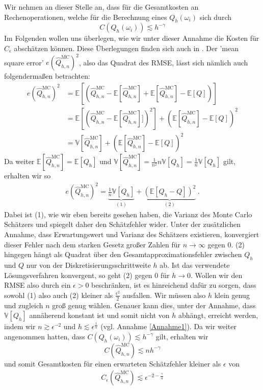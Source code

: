 Wir nehmen an dieser Stelle an, dass für die Gesamtkosten an Rechenoperationen, welche für die Berechnung eines $ Q_h(\omega_i) $ sich durch
 \[
 	C(Q_h(\omega_i))  \lesssim h^{- \gamma}
 \]
 Im Folgenden wollen uns überlegen, wie wir unter dieser Annahme die Kosten für $ C_{\epsilon} $ abschätzen können. Diese Überlegungen finden sich auch in \cite{cliffe2011multilevel}.
 Der 'mean square error' $ e(\widehat{Q}_{h,n}^{\text{MC}})^2 $, also das Quadrat des RMSE, lässt sich nämlich auch folgendermaßen betrachten:
 \begin{align}
 	e(\widehat{Q}_{h,n}^{\text{MC}})^2 &= \mathbb{E} \left[ \left( \widehat{Q}_{h,n}^{\text{MC}} -  \mathbb{E}[\widehat{Q}_{h,n}^{\text{MC}}] + \mathbb{E}[\widehat{Q}_{h,n}^{\text{MC}}] - \mathbb{E}[Q] \right) \right] \nonumber \\
 	&= \mathbb{E} \left[ ( \widehat{Q}_{h,n}^{\text{MC}} -    \mathbb{E}[\widehat{Q}_{h,n}^{\text{MC}}]])^2 \right] + \left( \mathbb{E}[\widehat{Q}_{h,n}^{\text{MC}}] - \mathbb{E}[Q] \right)^2 \nonumber \\
 	&= \mathbb{V}[\widehat{Q}_{h,n}^{\text{MC}}] + \left( \mathbb{E}[\widehat{Q}_{h,n}^{\text{MC}}] - \mathbb{E}[Q] \right)^2
 \end{align}
 Da weiter $ \mathbb{E}[\widehat{Q}_{h,n}^{\text{MC}}] = \mathbb{E}[Q_h] $ und $ \mathbb{V}[\widehat{Q}_{h,n}^{\text{MC}}] = \frac{1}{n^2} n \mathbb{V}[Q_h] = \frac{1}{n}  \mathbb{V}[Q_h] $ gilt, erhalten wir so 
 \begin{align}
 \label{mseMC}
	 e(\widehat{Q}_{h,n}^{\text{MC}})^2 = \underbrace{\frac{1}{n}  \mathbb{V}[Q_h]}_{(1)} + \underbrace{(\mathbb{E}[Q_h - Q])^2}_{(2)} \ .
 \end{align}
 Dabei ist (1), wie wir eben bereits gesehen haben, die Varianz des Monte Carlo Schätzers und spiegelt daher den Schätzfehler wider. Unter der zusätzlichen Annahme, dass Erwartungswert und Varianz des Schätzers existieren, konvergiert dieser Fehler nach dem starken Gesetz großer Zahlen für $ n \to \infty $ gegen $ 0 $.
 (2) hingegen hängt als Quadrat über den Gesamtapproximationsfehler zwischen $ Q_h $
 und $ Q $ nur von der Diskretisierungsschrittweite $ h $ ab. Ist das verwendete Lösungsverfahren konvergent, so geht (2) gegen $ 0 $ für $ h \to 0 $.
 Wollen wir den RMSE also durch ein $ \epsilon > 0 $ beschränken, ist es hinreichend dafür zu sorgen, dass sowohl (1) also auch (2) kleiner als $ \frac{\epsilon^2}{2} $ ausfallen. Wir müssen also $ h $ klein genug und zugleich $ n $ groß genug wählen.
 Genauer kann dies, unter der Annahme, dass $ \mathbb{V}[Q_h] $ annäherend konstant ist und somit nicht von $ h $ abhängt, erreicht werden, indem wir $ n \gtrsim \epsilon^{-2} $ und $ h \lesssim \epsilon^{\frac{1}{\alpha}}  $ (vgl. Annahme \ref{Annahme1}).
 Da wir weiter angenommen hatten, dass $ C(Q_h(\omega_i))  \lesssim h^{- \gamma} $ gilt, erhalten wir 
 \[ 
 	C(\widehat{Q}_{h,n}^{\text{MC}}) \lesssim n h^{-\gamma}
 \]
 und somit Gesamtkosten für einen erwarteten Schätzfehler kleiner als $ \epsilon $ von
 \begin{align}
	 C_{\epsilon}(\widehat{Q}_{h,n}^{\text{MC}}) \lesssim \epsilon^{-2-\frac{\gamma}{\alpha}}
 \end{align}
 
